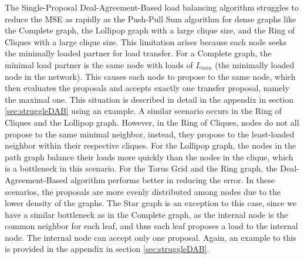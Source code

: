 The Single-Proposal Deal-Agreement-Based load balancing algorithm struggles to reduce the MSE as rapidly as the Push-Pull Sum algorithm for dense graphs like the Complete graph, the Lollipop graph with a large clique size, and the Ring of Cliques with a large clique size. This limitation arises because each node seeks the minimally loaded partner for load transfer. For a Complete graph, the minimal load partner is the same node with loads of $L_{min}$ (the minimally loaded node in the network). This causes each node to propose to the same node, which then evaluates the proposals and accepts exactly one transfer proposal, namely the maximal one. This situation is described in detail in the appendix in section \ref{sec:struggleDAB} using an example. A similar scenario occurs in the Ring of Cliques and the Lollipop graph. However, in the Ring of Cliques, nodes do not all propose to the same minimal neighbor, instead, they propose to the least-loaded neighbor within their respective cliques. For the Lollipop graph, the nodes in the path graph balance their loads more quickly than the nodes in the clique, which is a bottleneck in this scenario. For the Torus Grid and the Ring graph, the Deal-Agreement-Based algorithm performs better in reducing the error. In these scenarios, the proposals are more evenly distributed among nodes due to the lower density of the graphs. The Star graph is an exception to this case, since we have a similar bottleneck as in the Complete graph, as the internal node is the common neighbor for each leaf, and thus each leaf proposes a load to the internal node. The internal node can accept only one proposal. Again, an example to this is provided in the appendix in section \ref{sec:struggleDAB}.

